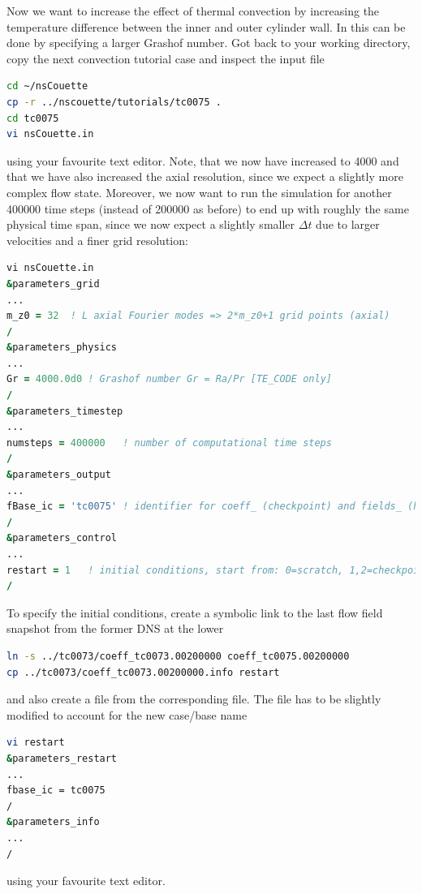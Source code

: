 \documentclass[a4paper, 11pt, DIV=11]{scrartcl}
\begin{document}
Now we want to increase the effect of thermal convection by increasing the
temperature difference between the inner and outer cylinder wall. In \nsc
this can be done by specifying a larger Grashof number. Got back to your working
directory, copy the next convection tutorial case and inspect the input file
\begin{lstlisting}[language=bash]
cd ~/nsCouette
cp -r ../nscouette/tutorials/tc0075 .
cd tc0075
vi nsCouette.in
\end{lstlisting}
using your favourite text editor. Note, that we now have increased \Gr to \num{4000}
and that we have also increased the axial resolution, since we expect a slightly more
complex flow state. Moreover, we now want to run the simulation for another
\num{400000} time steps (instead of \num{200000} as before) to end up with roughly
the same physical time span, since we now expect a slightly smaller $\Delta t$ due to
larger velocities and a finer grid resolution:
\begin{lstlisting}[language=fortran]
vi nsCouette.in
&parameters_grid
...
m_z0 = 32  ! L axial Fourier modes => 2*m_z0+1 grid points (axial)
/
&parameters_physics
...
Gr = 4000.0d0 ! Grashof number Gr = Ra/Pr [TE_CODE only]
/
&parameters_timestep
...
numsteps = 400000   ! number of computational time steps
/
&parameters_output
...
fBase_ic = 'tc0075' ! identifier for coeff_ (checkpoint) and fields_ (hdf5) files
/
&parameters_control
...
restart = 1   ! initial conditions, start from: 0=scratch, 1,2=checkpoint
/  
\end{lstlisting}


To specify the initial conditions, create a symbolic link to the last flow field snapshot
from the former DNS at the lower \Gr
\begin{lstlisting}[language=bash]
ln -s ../tc0073/coeff_tc0073.00200000 coeff_tc0075.00200000
cp ../tc0073/coeff_tc0073.00200000.info restart
\end{lstlisting}
and also create a file  from the corresponding  file.
The file  has to be slightly modified to account for the new case/base
name
\begin{lstlisting}[language=bash]
vi restart
&parameters_restart
...
fbase_ic = tc0075
/
&parameters_info
...
/
\end{lstlisting}
using your favourite text editor.
\end{document}
